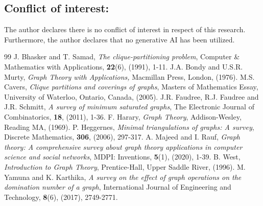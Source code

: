 \documentclass[12pt]{amsart}
\numberwithin{equation}{section}
\numberwithin{equation}{section}
\begin{document}
\subsection*{Conflict of interest:} The author declares there is no conflict of interest in respect of this research. Furthermore, the author declares that no generative AI has been utilized.

\begin{thebibliography}{99}
J. Bhasker and T. Samad, \emph{The clique-partitioning problem}, Computer \& Mathematics with Applications, \textbf{22}(6), (1991), 1-11.
J.A. Bondy and  U.S.R. Murty, \emph{Graph Theory with Applications,} Macmillan Press, London, (1976).
M.S. Cavers, \emph{Clique partitions and coverings of graphs}, Masters of Mathematics Essay, University of Waterloo, Ontario, Canada, (2005).
J.R. Faudree, R.J. Faudree and J.R. Schmitt, \emph{A survey of minimum saturated graphs}, The Electronic Journal of Combinatorics, \textbf{18}, (2011), 1-36.
F. Harary, \emph{Graph Theory}, Addison-Wesley, Reading MA, (1969).
P. Heggernes, \emph{Minimal triangulations of graphs: A survey}, Discrete Mathematics, \textbf{306}, (2006), 297-317.
A. Majeed and I. Rauf, \emph{Graph theory: A comprehensive survey about graph theory applications in computer science and social networks}, MDPI: Inventions, \textbf{5}(1), (2020), 1-39.
B. West, \emph{Introduction to Graph Theory}, Prentice-Hall, Upper Saddle River, (1996).
M. Yamuna and K. Karthika, \emph{A survey on the effect of graph operations on the domination number of a graph}, International Journal of Engineering and Technology, \textbf{8}(6), (2017), 2749-2771.
\end{thebibliography}			
\end{document}
